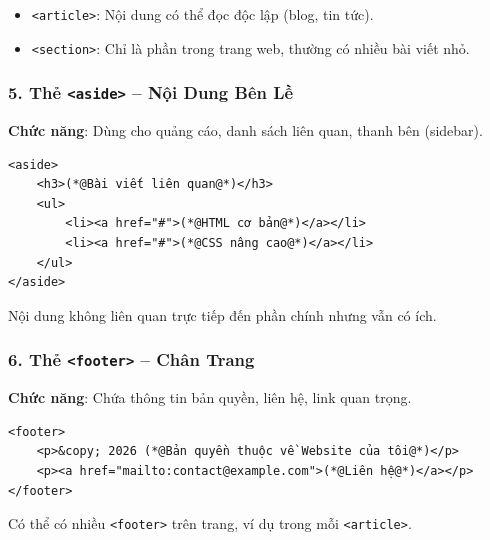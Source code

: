 \documentclass[11pt,oneside]{book}
\newcommand{\codeinline}[1]{\textcolor{accentOrange}{\texttt{#1}}}
\begin{document}
\begin{conceptBox}
\begin{itemize}[leftmargin=1.5em, itemsep=2pt, parsep=0pt]
    \item \codeinline{<article>}: Nội dung có thể đọc độc lập (blog, tin tức).
    \item \codeinline{<section>}: Chỉ là phần trong trang web, thường có nhiều bài viết nhỏ.
\end{itemize}
\end{conceptBox}

\subsubsection{5. Thẻ \codeinline{<aside>} -- Nội Dung Bên Lề}
\textbf{Chức năng}: Dùng cho quảng cáo, danh sách liên quan, thanh bên (sidebar).

\begin{codeWindow}
\begin{lstlisting}[language=HTML5]
<aside>
    <h3>(*@Bài viết liên quan@*)</h3>
    <ul>
        <li><a href="#">(*@HTML cơ bản@*)</a></li>
        <li><a href="#">(*@CSS nâng cao@*)</a></li>
    </ul>
</aside>
\end{lstlisting}
\end{codeWindow}

\begin{noteBox}
Nội dung không liên quan trực tiếp đến phần chính nhưng vẫn có ích.
\end{noteBox}

\subsubsection{6. Thẻ \codeinline{<footer>} -- Chân Trang}
\textbf{Chức năng}: Chứa thông tin bản quyền, liên hệ, link quan trọng.

\begin{codeWindow}
\begin{lstlisting}[language=HTML5]
<footer>
    <p>&copy; 2026 (*@Bản quyền thuộc về Website của tôi@*)</p>
    <p><a href="mailto:contact@example.com">(*@Liên hệ@*)</a></p>
</footer>
\end{lstlisting}
\end{codeWindow}

\begin{noteBox}
Có thể có nhiều \codeinline{<footer>} trên trang, ví dụ trong mỗi \codeinline{<article>}.
\end{noteBox}
\end{document}
